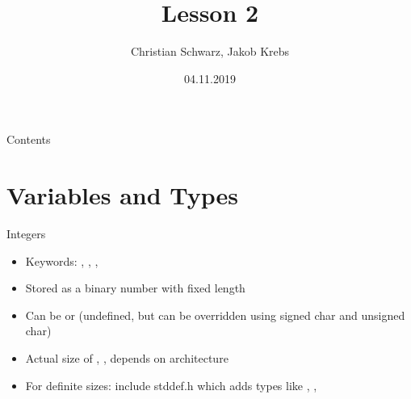 \documentclass[10pt,graphics,aspectratio=169,table]{beamer}
\title{Lesson 2}
\author{Christian Schwarz, Jakob Krebs}
\date{04.11.2019}
\begin{document}
\maketitle

\begin{frame}{Contents}
    \tableofcontents
\end{frame}



\section{Variables and Types}
\begin{frame}{Integers}
    \begin{itemize}
        \item Keywords: , , , 
        \item Stored as a binary number with fixed length
        \item Can be  or  (undefined, but can be overridden using signed char and unsigned char)
        \item Actual size of , ,  depends on architecture
        \item For definite sizes: include stddef.h which adds types like , , 
    \end{itemize}
\end{frame}
\end{document}
